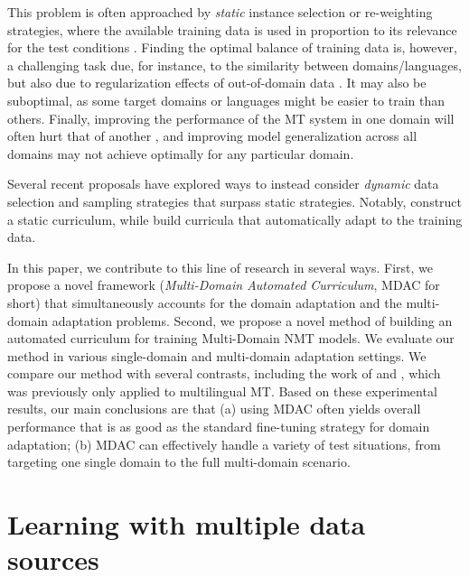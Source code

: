 \documentclass[11pt]{article}
\begin{document}
This problem is often approached by \emph{static} instance selection or re-weighting strategies, where the available training data is used in proportion to its relevance for the test conditions \citep{Moore10selection,Axelrod11domain}. Finding the optimal balance of training data is, however, a challenging task due, for instance, to the similarity between domains/languages, but also due to regularization effects of out-of-domain data \citep{Miceli-barone17regularization}. It may also be suboptimal, as some target domains or languages might be easier to train than others. Finally, improving the performance of the MT system in one domain will often hurt that of another \citep{Vanderwees17dynamic, Britz17mixing}, and improving model generalization across all domains \citep{koehn18findings} may not achieve optimally for any particular domain. 

Several recent proposals
have explored ways to instead consider \emph{dynamic} data selection and sampling strategies that surpass static strategies. Notably, \citet{Vanderwees17dynamic,Zhang19curriculum} construct a static curriculum, while \citet{Graves17automated,Platanios19competence,Kumar19reinforcement,Wang20learning-multi,Wang20balancing} build curricula that automatically adapt to the training data.

In this paper, we contribute to this line of research in several ways. First, we propose a novel framework (\emph{Multi-Domain Automated Curriculum}, MDAC for short) that simultaneously accounts for the domain adaptation and the multi-domain adaptation problems. Second, we propose a novel method of building an automated curriculum for training Multi-Domain NMT models. We evaluate our method in various single-domain and multi-domain adaptation settings. We compare our method with several contrasts, including the work of \citet{Zhang19curriculum} and \citet{Wang20balancing}, which was previously only applied to multilingual MT.
Based on these experimental results, our main conclusions are that (a) using MDAC often yields overall performance that is as good as the standard fine-tuning strategy for domain adaptation; (b) MDAC can effectively handle a variety of test situations, from targeting one single domain to the full multi-domain scenario. %

\section{Learning with multiple data sources} \label{sec:mdmt}
\end{document}
